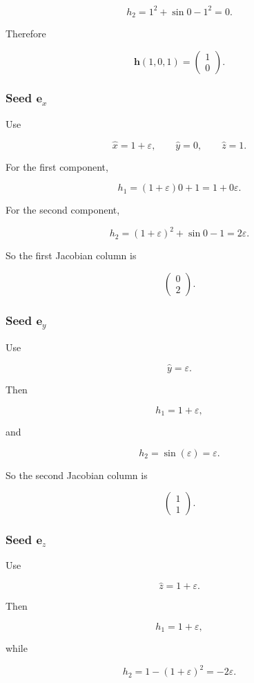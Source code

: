 \documentclass[10pt]{article}
\begin{document}
\[
h_2=1^2+\sin 0-1^2=0.
\]

Therefore

\[
{
\mathbf h(1,0,1)
=
\begin{pmatrix}1\\0\end{pmatrix}
}.
\]

\subsubsection*{Seed $\mathbf e_x$}
Use

\[
\hat{x}=1+\varepsilon,
\qquad
\hat{y}=0,
\qquad
\hat{z}=1.
\]

For the first component,

\[
h_1=(1+\varepsilon)0+1=1+0\varepsilon.
\]

For the second component,

\[
h_2=(1+\varepsilon)^2+\sin 0-1
=2\varepsilon.
\]

So the first Jacobian column is

\[
\begin{pmatrix}0\\2\end{pmatrix}.
\]

\subsubsection*{Seed $\mathbf e_y$}
Use

\[
\hat{y}=\varepsilon.
\]

Then

\[
h_1=1+\varepsilon,
\]

and

\[
h_2=\sin(\varepsilon)=\varepsilon.
\]

So the second Jacobian column is

\[
\begin{pmatrix}1\\1\end{pmatrix}.
\]

\subsubsection*{Seed $\mathbf e_z$}
Use

\[
\hat{z}=1+\varepsilon.
\]

Then

\[
h_1=1+\varepsilon,
\]

while

\[
h_2
=1-(1+\varepsilon)^2
=-2\varepsilon.
\]
\end{document}

